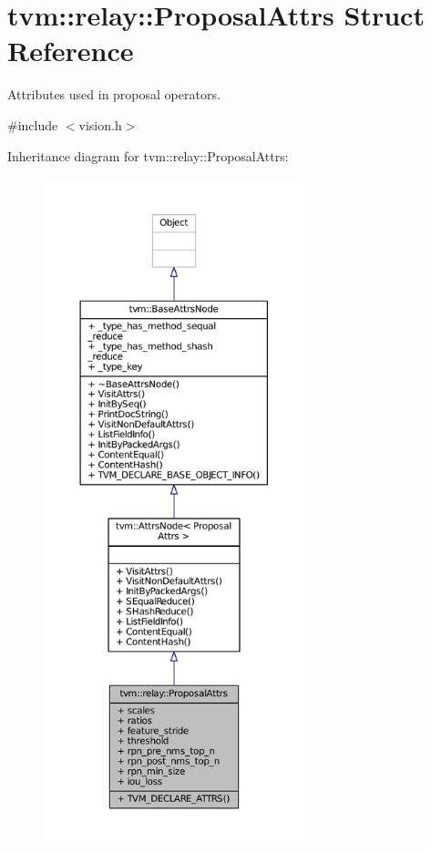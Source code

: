 \hypertarget{structtvm_1_1relay_1_1ProposalAttrs}{}\section{tvm\+:\+:relay\+:\+:Proposal\+Attrs Struct Reference}
\label{structtvm_1_1relay_1_1ProposalAttrs}


Attributes used in proposal operators.  




{\ttfamily \#include $<$vision.\+h$>$}



Inheritance diagram for tvm\+:\+:relay\+:\+:Proposal\+Attrs\+:
\nopagebreak
\begin{figure}[H]
\begin{center}
\leavevmode
\includegraphics[height=550pt]{structtvm_1_1relay_1_1ProposalAttrs__inherit__graph}
\end{center}
\end{figure}


